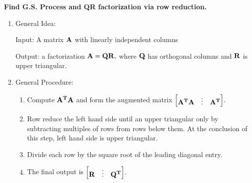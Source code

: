 \documentclass[12pt, a4paper]{article}
\def\T{{\vb{T}}}
\def\matrixA{\vb{A}}
\begin{document}
\begin{framed}
	\textbf{Find G.S. Process and QR factorization via row reduction.}
	\begin{enumerate}
		\item General Idea: \par Input: A matrix $\vb A$ with linearly independent columns\par Output: a factorization $\vb A=\vb Q\vb R,$ where $\vb Q$ has orthogonal columns and $\vb R$ is upper triangular.
		\item General Procedure: 
		\begin{enumerate}
			\item Compute $\matrixA^\T\matrixA$ and form the augmented matrix $\mqty[{\matrixA^\T\matrixA&\vdots&\matrixA^\T}].$ 
			\item Row reduce the left hand side until an upper triangular only by subtracting multiples of rows from rows below them. At the conclusion of this step, left hand side is upper triangular.
			\item Divide each row by the square root of the leading diagonal entry.
			\item The final output is $\mqty[\vb R&\vdots&\vb Q^\T].$
		\end{enumerate}
	\end{enumerate}	
\end{framed}
\end{document}
